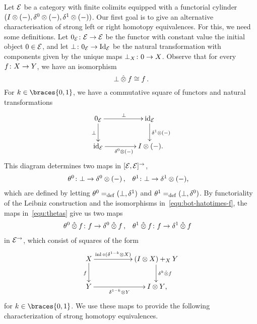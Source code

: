 \documentclass[reqno,10pt,a4paper,oneside]{amsart}
\begin{document}
Let $\mathcal{E}$ be a category with finite colimits equipped with a functorial cylinder $(I \otimes (-), \delta^0 \otimes (-), \delta^1 \otimes (-))$.
Our first goal is to give an alternative characterisation of strong left or right homotopy equivalences.
For this, we need some definitions.
Let $0_{\mathcal{E}} \colon \mathcal{E} \to \mathcal{E}$ be the functor with constant value the initial object $0 \in \mathcal{E}$, and let $\bot \colon 0_{\mathcal{E}} \rightarrow \operatorname{Id}_{\mathcal{E}}$ be the natural transformation with components given by the unique maps $\bot_X \colon 0 \to X$.
Observe that for every $f \colon X \to Y$, we have an isomorphism
\begin{equation}
\label{equ:bot-hatotimes-f}
\bot \mathbin{\hat{\otimes}} f \cong f \, .
\end{equation}
For $k \in \braces{0, 1}$, we have a commutative square of functors and natural transformations
\[
\xymatrix@C+2em{
  0_\catE
  \ar[r]^{\bot}
  \ar[d]_{\bot}
&
  \id_\catE
  \ar[d]^{\rcyl \otimes (-)}
\\
  \id_\catE
  \ar[r]_{\lcyl \otimes (-)}
&
  \interval \otimes (-)
\rlap{.}}
\]
This diagram determines two maps in $[\mathcal{E}, \mathcal{E}]^\to$,
\begin{equation} \label{equ:thetas}
\begin{aligned}
  \thetal &\co \bot \rightarrow \lcyl \otimes (-)
\, ,&
  \thetar &\co \bot \rightarrow \rcyl \otimes (-) \rlap{,}
\end{aligned}
\end{equation}
which are defined by letting $\theta^0 =_{\operatorname{def}} (\bot, \delta^1)$ and $\theta^1 =_{\operatorname{def}} (\bot, \delta^0)$.
By functoriality of the Leibniz construction and the isomorphisms in~\eqref{equ:bot-hatotimes-f}, the maps in~\eqref{equ:thetas} give us two maps
\begin{equation*}
\begin{aligned}
  \theta^0 \mathbin{\hat{\otimes}} f &\colon f \to \delta^0 \mathbin{\hat{\otimes}} f
\, ,&
  \theta^1 \mathbin{\hat{\otimes}} f &\colon f \to \delta^1 \mathbin{\hat{\otimes}} f
\end{aligned}
\end{equation*}
in $\mathcal{E}^\to$, which consist of squares of the form
\[
\xymatrix@C+3em{
  X
  \ar[r]^-{\inl \cc (\kcylinv \otimes X)}
  \ar[d]_{f}
&
  (\interval \otimes X) +_{X} Y \ar[d]^{\kcyl \hatotimes f}
\\
  Y
  \ar[r]_-{\kcylinv \otimes Y}
&
  \interval \otimes Y
\rlap{,}}
\]
for $k \in \braces{0, 1}$.
We use these maps to provide the following characterization of strong homotopy equivalences.
\end{document}
